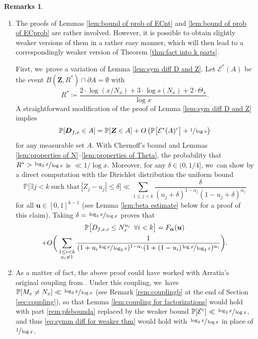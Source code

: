 \documentclass[11pt]{article}
\newcommand{\skpt}{\smallskip}
\newenvironment{enumeratea}
{\bgroup\def\theenumi{\alph{enumi}}\begin{enumerate}}
{\end{enumerate}\egroup}
\newcommand{\bu}{{\boldsymbol u}}
\newcommand{\bD}{{\boldsymbol D}}
\newcommand{\bZ}{{\boldsymbol Z}}
\newcommand{\PP}{\mathbb{P}}
\newcommand{\boldalpha}{\boldsymbol{\alpha}}
\newcommand{\EC}{\mathcal{E}}
\newcommand{\bg}{\big}
\newcommand{\bgg}{\Big}
\newcommand{\bggg}{\bigg}
\theoremstyle{plain}
\theoremstyle{definition}
\newtheorem*{remss}{Remarks}
\begin{document}
\skpt
\begin{remss}
\begin{enumeratea}
\item\label{rem:pfsbounda}
The proofs of Lemmas \ref{lem:bound of prob of ECnt} and \ref{lem:bound of prob of ECprob} are rather involved. However, it is possible to obtain slightly weaker versions of them in a rather easy manner, which will then lead to a correspondingly weaker version of Theorem \ref{thm:fact into k parts}.

First, we~prove a variation of Lemma \ref{lem:sym diff D and Z}. Let $\EC^*(A)$ be the event $B(\bZ,R^*)\cap \partial A=\emptyset$ with
\[
R^* \coloneqq \frac{2\cdot \log(x/N_x) + 3\cdot \log s(N_x) + 2\cdot \Theta_x}{\log x}.
\]
A straightforward modification of the proof of Lemma \ref{lem:sym diff D and Z} implies
\begin{equation}
\label{eq:symm diff for weaker thm}
\PP[\bD_{f, x} \in A] = \PP[\bZ \in A] + O\left(\PP\bg[\EC^*(A)^c\bg] + \sfrac{1}{\log x}\right)
\end{equation}
for any measurable set $A$. With Chernoff's bound and Lemmas \ref{lem:properties of N}--\ref{lem:properties of Theta}, the probability that $R^*>\sfrac{\log_2 x}{\log x}$ is $\ll 1/\log x$. Moreover, for any $\delta\in(0,1/4]$, we~can show by a direct computation with the Dirichlet distribution the uniform bound
\[
\PP\bgg[\exists j < k\ \text{such that}\ |Z_j-u_j|\le \delta \bgg] \ll \sum_{1\le j<k} \frac{\delta}{(u_j+\delta)^{1-\alpha_j}(1-u_j+\delta)^{\alpha_j}}
\]
for all $\bu\in [0,1]^{k-1}$ (see Lemma \ref{lem:beta estimate} below for a proof of this claim). Taking \hbox{$\delta=\sfrac{\log_2x}{\log x}$} proves that
\begin{multline*}
\PP\bg[D_{f,x,i} \le N_x^{u_i}\ \, \forall i < k\bg] = F_{\boldalpha}(\bu) \\
+ O\bggg(\sum_{\substack{1 \le i < k \\ u_i \ne 1}} \frac{1}{(1+u_i\sfrac{\log x}{\log_2x})^{1-\alpha_i}(1+(1-u_i)\sfrac{\log x}{\log_2x})^{\alpha_i}}\bggg).
\end{multline*}

\item\label{rem:pfsboundb}
As a matter of fact, the above proof could have worked with Arratia's original coupling from \cite{Arratia02}. Under this coupling, we~have $\PP[M_x \ne N_x] \ll \sfrac{\log_2x}{\log x}$ (see Remark \eqref{rem:couplingb} at the end of Section \ref{sec:coupling}), so that Lemma \ref{lem:coupling for factorizations} would hold with part \eqref{rem:pfsbounda} replaced by the weaker bound $\PP[\EC^c]\ll \sfrac{\log_2x}{\log x}$, and thus \eqref{eq:symm diff for weaker thm} would hold with $\sfrac{\log_2x}{\log x}$ in place of $\sfrac{1}{\log x}$.
\end{enumeratea}
\end{remss}
\end{document}
